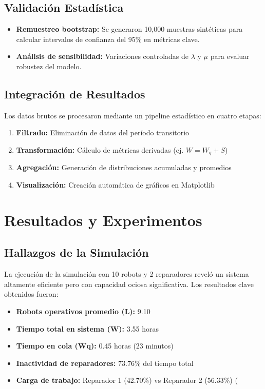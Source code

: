 \documentclass[12pt, a4paper]{article}
\begin{document}
\subsection{Validación Estadística}
\begin{itemize}
    \item \textbf{Remuestreo bootstrap:} Se generaron 10,000 muestras sintéticas para calcular intervalos de confianza del 95\% en métricas clave.
    
    \item \textbf{Análisis de sensibilidad:} Variaciones controladas de $\lambda$ y $\mu$ para evaluar robustez del modelo.
    
\end{itemize}


\subsection{Integración de Resultados}
Los datos brutos se procesaron mediante un pipeline estadístico en cuatro etapas:
\begin{enumerate}
    \item \textbf{Filtrado:} Eliminación de datos del período transitorio
    \item \textbf{Transformación:} Cálculo de métricas derivadas (ej. $W = W_q + S$)
    \item \textbf{Agregación:} Generación de distribuciones acumuladas y promedios
    \item \textbf{Visualización:} Creación automática de gráficos en Matplotlib
\end{enumerate}

\section{Resultados y Experimentos}
\label{sec:resultados}

\subsection{Hallazgos de la Simulación}
La ejecución de la simulación con 10 robots y 2 reparadores reveló un sistema altamente eficiente pero con capacidad ociosa significativa. Los resultados clave obtenidos fueron:
\begin{itemize}
    \item \textbf{Robots operativos promedio (L):} 9.10
    \item \textbf{Tiempo total en sistema (W):} 3.55 horas
    \item \textbf{Tiempo en cola (Wq):} 0.45 horas (23 minutos)
    \item \textbf{Inactividad de reparadores:} 73.76\% del tiempo total
    \item \textbf{Carga de trabajo:} Reparador 1 (42.70\%) vs Reparador 2 (56.33\%) (%
\end{itemize}
\end{document}
